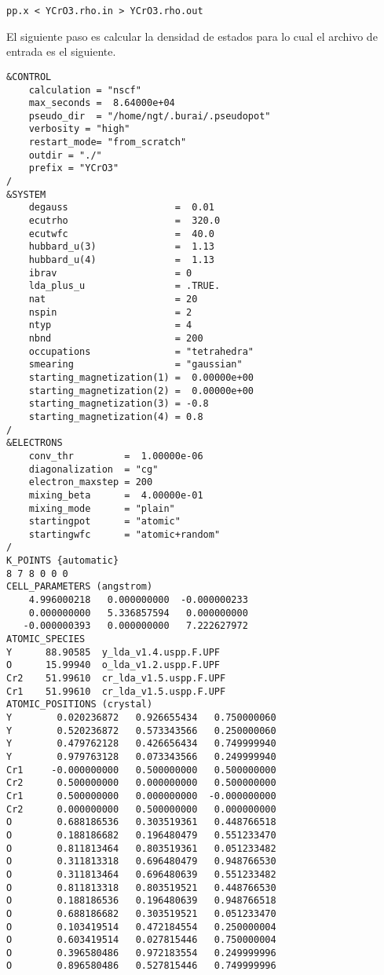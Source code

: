 \begin{lstlisting}
pp.x < YCrO3.rho.in > YCrO3.rho.out
\end{lstlisting}

\noindent El siguiente paso es calcular la densidad de estados para lo cual el archivo de entrada es el siguiente.

\begin{lstlisting}
&CONTROL
    calculation = "nscf"
    max_seconds =  8.64000e+04
    pseudo_dir  = "/home/ngt/.burai/.pseudopot"
    verbosity = "high"
    restart_mode= "from_scratch"
    outdir = "./"
    prefix = "YCrO3"
/
&SYSTEM
    degauss                   =  0.01
    ecutrho                   =  320.0
    ecutwfc                   =  40.0
    hubbard_u(3)              =  1.13
    hubbard_u(4)              =  1.13
    ibrav                     = 0
    lda_plus_u                = .TRUE.
    nat                       = 20
    nspin                     = 2
    ntyp                      = 4
    nbnd                      = 200
    occupations               = "tetrahedra"
    smearing                  = "gaussian"
    starting_magnetization(1) =  0.00000e+00
    starting_magnetization(2) =  0.00000e+00
    starting_magnetization(3) = -0.8
    starting_magnetization(4) = 0.8
/
&ELECTRONS
    conv_thr         =  1.00000e-06
    diagonalization  = "cg"
    electron_maxstep = 200
    mixing_beta      =  4.00000e-01
    mixing_mode      = "plain"
    startingpot      = "atomic"
    startingwfc      = "atomic+random"
/
K_POINTS {automatic}
8 7 8 0 0 0
CELL_PARAMETERS (angstrom)
    4.996000218   0.000000000  -0.000000233
    0.000000000   5.336857594   0.000000000
   -0.000000393   0.000000000   7.222627972
ATOMIC_SPECIES
Y      88.90585  y_lda_v1.4.uspp.F.UPF
O      15.99940  o_lda_v1.2.uspp.F.UPF
Cr2    51.99610  cr_lda_v1.5.uspp.F.UPF
Cr1    51.99610  cr_lda_v1.5.uspp.F.UPF
ATOMIC_POSITIONS (crystal)
Y        0.020236872   0.926655434   0.750000060
Y        0.520236872   0.573343566   0.250000060
Y        0.479762128   0.426656434   0.749999940
Y        0.979763128   0.073343566   0.249999940
Cr1     -0.000000000   0.500000000   0.500000000
Cr2      0.500000000   0.000000000   0.500000000
Cr1      0.500000000   0.000000000  -0.000000000
Cr2      0.000000000   0.500000000   0.000000000
O        0.688186536   0.303519361   0.448766518
O        0.188186682   0.196480479   0.551233470
O        0.811813464   0.803519361   0.051233482
O        0.311813318   0.696480479   0.948766530
O        0.311813464   0.696480639   0.551233482
O        0.811813318   0.803519521   0.448766530
O        0.188186536   0.196480639   0.948766518
O        0.688186682   0.303519521   0.051233470
O        0.103419514   0.472184554   0.250000004
O        0.603419514   0.027815446   0.750000004
O        0.396580486   0.972183554   0.249999996
O        0.896580486   0.527815446   0.749999996
\end{lstlisting}

